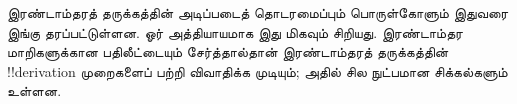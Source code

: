 \documentclass[../../../include/open-logic-chapter]{subfiles}
\begin{document}


\begin{editorial}
இரண்டாம்தரத் தருக்கத்தின் அடிப்படைத் தொடரமைப்பும் பொருள்கோளும் இதுவரை
இங்கு தரப்பட்டுள்ளன. ஓர் அத்தியாயமாக இது மிகவும் சிறியது.
இரண்டாம்தர மாறிகளுக்கான பதிலீட்டையும் சேர்த்தால்தான் இரண்டாம்தரத்
தருக்கத்தின் !!{derivation} முறைகளைப் பற்றி விவாதிக்க முடியும்;
அதில் சில நுட்பமான சிக்கல்களும் உள்ளன.
\end{editorial}







\OLEndChapterHook
\end{document}

